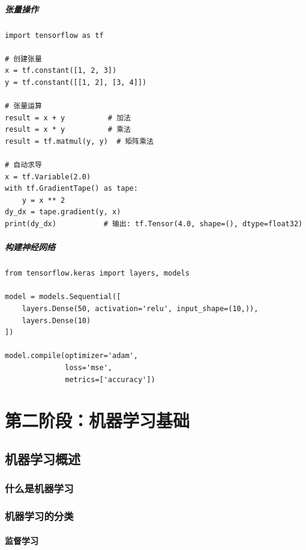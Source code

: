 \documentclass[12pt,UTF8]{ctexbook}
\begin{document}
\subsubsection{张量操作}

\begin{lstlisting}
import tensorflow as tf

# 创建张量
x = tf.constant([1, 2, 3])
y = tf.constant([[1, 2], [3, 4]])

# 张量运算
result = x + y          # 加法
result = x * y          # 乘法
result = tf.matmul(y, y)  # 矩阵乘法

# 自动求导
x = tf.Variable(2.0)
with tf.GradientTape() as tape:
    y = x ** 2
dy_dx = tape.gradient(y, x)
print(dy_dx)           # 输出: tf.Tensor(4.0, shape=(), dtype=float32)
\end{lstlisting}

\subsubsection{构建神经网络}

\begin{lstlisting}
from tensorflow.keras import layers, models

model = models.Sequential([
    layers.Dense(50, activation='relu', input_shape=(10,)),
    layers.Dense(10)
])

model.compile(optimizer='adam',
              loss='mse',
              metrics=['accuracy'])
\end{lstlisting}

\part{第二阶段：机器学习基础}

\chapter{机器学习概述}
\label{chap:ml_overview}

\section{什么是机器学习}

\section{机器学习的分类}

\subsection{监督学习}
\end{document}
